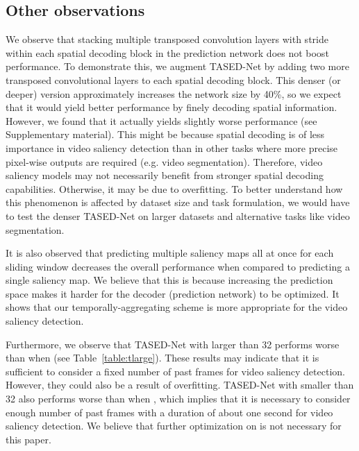 \documentclass[10pt,twocolumn,letterpaper]{article}
\newcommand{\modelname}{TASED-Net}
\begin{document}
\begin{table}[!t]
\subsection{Other observations} \label{subsec:dense}
We observe that stacking multiple transposed convolution layers with stride  within each spatial decoding block in the prediction network does not boost performance. To demonstrate this, we augment \modelname{} by adding two more transposed convolutional layers to each spatial decoding block. This denser (or deeper) version approximately increases the network size by 40\%, so we expect that it would yield better performance by finely decoding spatial information. However, we found that it actually yields slightly worse performance (see Supplementary material). This might be because spatial decoding is of less importance in video saliency detection than in other tasks where more precise pixel-wise outputs are required (e.g. video segmentation). Therefore, video saliency models may not necessarily benefit from stronger spatial decoding capabilities. Otherwise, it may be due to overfitting. To better understand how this phenomenon is affected by dataset size and task formulation, we would have to test the denser \modelname{} on larger datasets and alternative tasks like video segmentation.

It is also observed that predicting multiple saliency maps all at once for each sliding window decreases the overall performance when compared to predicting a single saliency map. We believe that this is because increasing the prediction space makes it harder for the decoder (prediction network) to be optimized. It shows that our temporally-aggregating scheme is more appropriate for the video saliency detection.

Furthermore, we observe that \modelname{} with  larger than 32 performs worse than when  (see Table~\ref{table:tlarge}). These results may indicate that it is sufficient to consider a fixed number of past frames for video saliency detection. However, they could also be a result of overfitting. \modelname{} with  smaller than 32 also performs worse than when , which implies that it is necessary to consider enough number of past frames with a duration of about one second for video saliency detection. We believe that further optimization on  is not necessary for this paper.


\end{table}
\end{document}
